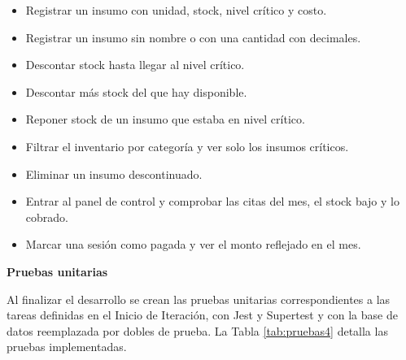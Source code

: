\documentclass[12pt,letterpaper,oneside]{report}
\newcommand{\titulopar}[1]{\par\textbf{#1}\par}
\begin{document}
\begin{itemize}
  \item Registrar un insumo con unidad, stock, nivel crítico y costo.
  \item Registrar un insumo sin nombre o con una cantidad con decimales.
  \item Descontar stock hasta llegar al nivel crítico.
  \item Descontar más stock del que hay disponible.
  \item Reponer stock de un insumo que estaba en nivel crítico.
  \item Filtrar el inventario por categoría y ver solo los insumos críticos.
  \item Eliminar un insumo descontinuado.
  \item Entrar al panel de control y comprobar las citas del mes, el stock bajo y lo cobrado.
  \item Marcar una sesión como pagada y ver el monto reflejado en el mes.
\end{itemize}

\vspace{\parskip}
\titulopar{Pruebas unitarias}
Al finalizar el desarrollo se crean las pruebas unitarias correspondientes a las tareas definidas en el Inicio de Iteración, con Jest y Supertest y con la base de datos reemplazada por dobles de prueba. La Tabla \ref{tab:pruebas4} detalla las pruebas implementadas.
\end{document}
